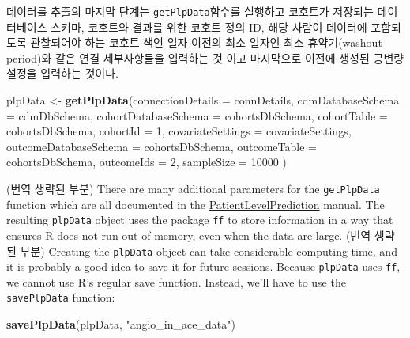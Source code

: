 \documentclass[11pt]{book}
\newenvironment{Shaded}{\begin{snugshade}}{\end{snugshade}}
\newcommand{\KeywordTok}[1]{\textcolor[rgb]{0.13,0.29,0.53}{\textbf{#1}}}
\newcommand{\DataTypeTok}[1]{\textcolor[rgb]{0.13,0.29,0.53}{#1}}
\newcommand{\DecValTok}[1]{\textcolor[rgb]{0.00,0.00,0.81}{#1}}
\newcommand{\StringTok}[1]{\textcolor[rgb]{0.31,0.60,0.02}{#1}}
\newcommand{\NormalTok}[1]{#1}
\theoremstyle{definition}
\theoremstyle{definition}
\theoremstyle{definition}
\theoremstyle{remark}
\begin{document}
데이터를 추출의 마지막 단계는 \texttt{getPlpData}함수를 실행하고
코호트가 저장되는 데이터베이스 스키마, 코호트와 결과를 위한 코호트 정의
ID, 해당 사람이 데이터에 포함되도록 관찰되어야 하는 코호트 색인 일자
이전의 최소 일자인 최소 휴약기(washout period)와 같은 연결 세부사항들을
입력하는 것 이고 마지막으로 이전에 생성된 공변량 설정을 입력하는 것이다.

\begin{Shaded}
\begin{Highlighting}[]
\NormalTok{plpData <-}\StringTok{ }\KeywordTok{getPlpData}\NormalTok{(}\DataTypeTok{connectionDetails =}\NormalTok{ connDetails,}
                      \DataTypeTok{cdmDatabaseSchema =}\NormalTok{ cdmDbSchema,}
                      \DataTypeTok{cohortDatabaseSchema =}\NormalTok{ cohortsDbSchema,}
                      \DataTypeTok{cohortTable =}\NormalTok{ cohortsDbSchema,}
                      \DataTypeTok{cohortId =} \DecValTok{1}\NormalTok{,}
                      \DataTypeTok{covariateSettings =}\NormalTok{ covariateSettings,}
                      \DataTypeTok{outcomeDatabaseSchema =}\NormalTok{ cohortsDbSchema,}
                      \DataTypeTok{outcomeTable =}\NormalTok{ cohortsDbSchema,}
                      \DataTypeTok{outcomeIds =} \DecValTok{2}\NormalTok{,}
                      \DataTypeTok{sampleSize =} \DecValTok{10000}
\NormalTok{)}
\end{Highlighting}
\end{Shaded}

(번역 생략된 부분) There are many additional parameters for the
\texttt{getPlpData} function which are all documented in the
\href{https://ohdsi.github.io/PatientLevelPrediction/}{PatientLevelPrediction}
manual. The resulting \texttt{plpData} object uses the package
\texttt{ff} to store information in a way that ensures R does not run
out of memory, even when the data are large. (번역 생략된 부분) Creating
the \texttt{plpData} object can take considerable computing time, and it
is probably a good idea to save it for future sessions. Because
\texttt{plpData} uses \texttt{ff}, we cannot use R's regular save
function. Instead, we'll have to use the \texttt{savePlpData} function:

\begin{Shaded}
\begin{Highlighting}[]
\KeywordTok{savePlpData}\NormalTok{(plpData, }\StringTok{"angio_in_ace_data"}\NormalTok{)}
\end{Highlighting}
\end{Shaded}
\end{document}

